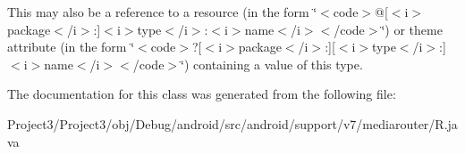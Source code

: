 This may also be a reference to a resource (in the form \char`\"{}$<$code$>$@\mbox{[}$<$i$>$package$<$/i$>$\+:\mbox{]}$<$i$>$type$<$/i$>$\+:$<$i$>$name$<$/i$>$$<$/code$>$\char`\"{}) or theme attribute (in the form \char`\"{}$<$code$>$?\mbox{[}$<$i$>$package$<$/i$>$\+:\mbox{]}\mbox{[}$<$i$>$type$<$/i$>$\+:\mbox{]}$<$i$>$name$<$/i$>$$<$/code$>$\char`\"{}) containing a value of this type. 

The documentation for this class was generated from the following file\+:\begin{DoxyCompactItemize}
\item 
Project3/\+Project3/obj/\+Debug/android/src/android/support/v7/mediarouter/R.\+java\end{DoxyCompactItemize}
